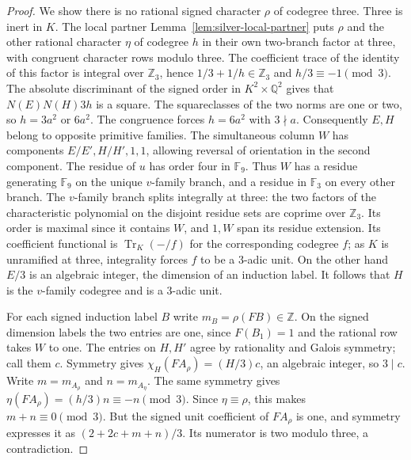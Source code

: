 \documentclass[11pt,reqno]{amsart}
\theoremstyle{remark}\newtheorem{remark}[theorem]{Remark}
\numberwithin{equation}{section}
\begin{document}
\begin{proof}
We show there is no rational signed character $\rho$ of codegree
three. Three is inert in $K$. The local partner
Lemma~\ref{lem:silver-local-partner} puts $\rho$ and the other rational
character $\eta$ of codegree $h$ in their own two-branch factor
at three, with congruent character rows modulo three. The
coefficient trace of the identity of this factor is integral over
$\mathbb Z_3$, hence $1/3+1/h\in\mathbb Z_3$ and
$h/3\equiv-1\pmod3$. The absolute discriminant of the signed
order in $K^2\times\mathbb Q^2$ gives that
$N(E)N(H)3h$ is a square. The squareclasses of the two norms are
one or two, so $h=3a^2$ or $6a^2$. The congruence forces
$h=6a^2$ with $3\nmid a$. Consequently $E,H$ belong to opposite
primitive families. The simultaneous column $W$ has components
$E/E',H/H',1,1$, allowing reversal of orientation in the second
component. The residue of $u$ has order four in $\mathbb F_9$.
Thus $W$ has a residue generating $\mathbb F_9$ on the unique
$v$-family branch, and a residue in $\mathbb F_3$ on every
other branch. The $v$-family branch splits integrally at three:
the two factors of the characteristic polynomial on the disjoint
residue sets are coprime over $\mathbb Z_3$. Its order is maximal
since it contains $W$, and $1,W$ span its residue extension.
Its coefficient functional is $\operatorname{Tr}_K(-/f)$ for
the corresponding codegree $f$; as $K$ is unramified at three,
integrality forces $f$ to be a $3$-adic unit. On the other hand
$E/3$ is an algebraic integer, the dimension of an induction label.
It follows that $H$ is the $v$-family codegree and is a $3$-adic unit.

For each signed induction label $B$ write $m_B=\rho(FB)\in\mathbb Z$.
On the signed dimension labels the two entries are one, since
$F(B_1)=1$ and the rational row takes $W$ to one. The entries on
$H,H'$ agree by rationality and Galois symmetry; call them $c$.
Symmetry gives $\chi_H(F A_\rho)=(H/3)c$, an algebraic integer,
so $3\mid c$. Write $m=m_{A_\rho}$ and $n=m_{A_\eta}$.
The same symmetry gives
$\eta(F A_\rho)=(h/3)n\equiv-n\pmod3$.
Since $\eta\equiv\rho$, this makes $m+n\equiv0\pmod3$.
But the signed unit coefficient of $F A_\rho$ is one, and
symmetry expresses it as $(2+2c+m+n)/3$. Its numerator is two
modulo three, a contradiction.


\end{proof}
\end{document}
